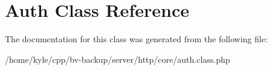 \hypertarget{class_auth}{}\section{Auth Class Reference}
\label{class_auth}


The documentation for this class was generated from the following file\+:\begin{DoxyCompactItemize}
\item 
/home/kyle/cpp/bv-\/backup/server/http/core/auth.\+class.\+php\end{DoxyCompactItemize}
